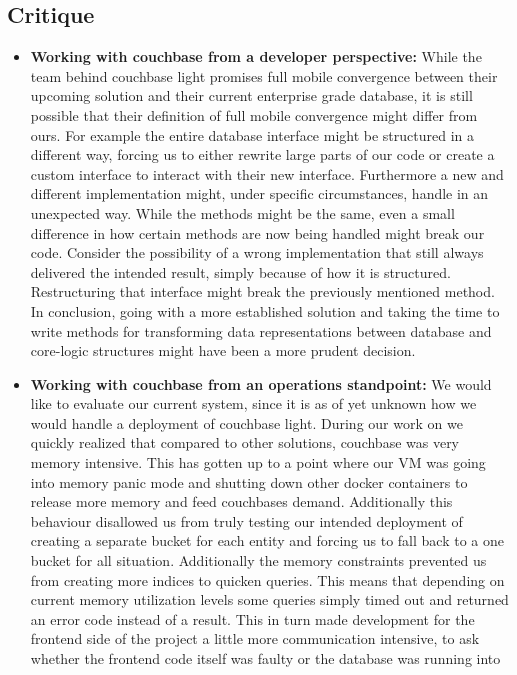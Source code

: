 \subsection{Critique}
\label{ssec:databaseEvalCrit}
\begin{itemize}
\item \label{db_crit_one} \textbf{Working with couchbase from a developer perspective:}
While the team behind couchbase light promises full mobile convergence between their upcoming solution and their current enterprise grade database, it is still possible that their definition of full mobile convergence might differ from ours.
For example the entire database interface might be structured in a different way, forcing us to either rewrite large parts of our code or create a custom interface to interact with their new interface. Furthermore a new and different implementation might, under specific circumstances, handle in an unexpected way.
While the methods might be the same, even a small difference in how certain methods are now being handled might break our code. Consider the possibility of a wrong implementation that still always delivered the intended result, simply because of how it is structured. Restructuring that interface might break the previously mentioned method.
In conclusion, going with a more established solution and taking the time to write methods for transforming data representations between database and core-logic structures might have been a more prudent decision.
\item \label{db_crit_two} \textbf{Working with couchbase from an operations standpoint:}
We would like to evaluate our current system, since it is as of yet unknown how we would handle a deployment of couchbase light.
During our work on \projectName{} we quickly realized that compared to other solutions, couchbase was very memory intensive. This has gotten up to a point where our VM was going into memory panic mode and shutting down other docker containers to release more memory and feed couchbases demand.
Additionally this behaviour disallowed us from truly testing our intended deployment of creating a separate bucket for each entity and forcing us to fall back to a one bucket for all situation. Additionally the memory constraints prevented us from creating more indices to quicken queries.
This means that depending on current memory utilization levels some queries simply timed out and returned an error code instead of a result. This in turn made development for the frontend side of the project a little more communication intensive, to ask whether the frontend code itself was faulty or the database was running into

\end{itemize}
